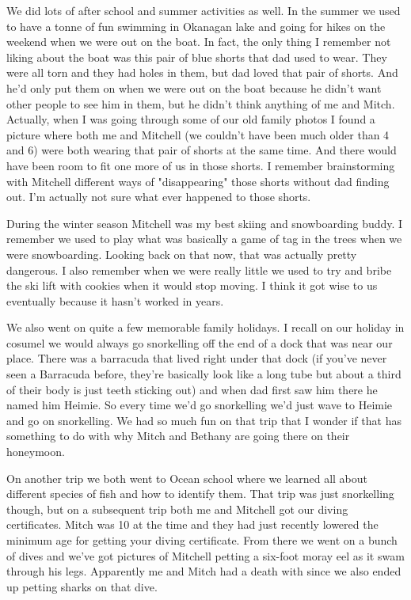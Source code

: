 We did lots of after school and summer activities as well. In the summer we used to have a tonne of fun swimming in Okanagan lake and going for hikes on the weekend when we were out on the boat. In fact, the only thing I remember not liking about the boat was this pair of blue shorts that dad used to wear. They were all torn and they had holes in them, but dad loved that pair of shorts. And he'd only put them on when we were out on the boat because he didn't want other people to see him in them, but he didn't think anything of me and Mitch. Actually, when I was going through some of our old family photos I found a picture where both me and Mitchell (we couldn't have been much older than 4 and 6) were both wearing that pair of shorts at the same time. And there would have been room to fit one more of us in those shorts. I remember brainstorming with Mitchell different ways of "disappearing" those shorts without dad finding out. I'm actually not sure what ever happened to those shorts.

During the winter season Mitchell was my best skiing and snowboarding buddy. I remember we used to play what was basically a game of tag in the trees when we were snowboarding. Looking back on that now, that was actually pretty dangerous. I also remember when we were really little we used to try and bribe the ski lift with cookies when it would stop moving. I think it got wise to us eventually because it hasn't worked in years.

We also went on quite a few memorable family holidays. I recall on our holiday in cosumel we would always go snorkelling off the end of a dock that was near our place. There was a barracuda that lived right under that dock (if you've never seen a Barracuda before, they're basically look like a long tube but about a third of their body is just teeth sticking out) and when dad first saw him there he named him Heimie. So every time we'd go snorkelling we'd just wave to Heimie and go on snorkelling. We had so much fun on that trip that I wonder if that has something to do with why Mitch and Bethany are going there on their honeymoon.

On another trip we both went to Ocean school where we learned all about different species of fish and how to identify them. That trip was just snorkelling though, but on a subsequent trip both me and Mitchell got our diving certificates. Mitch was 10 at the time and they had just recently lowered the minimum age for getting your diving certificate. From there we went on a bunch of dives and we've got pictures of Mitchell petting a six-foot moray eel as it swam through his legs. Apparently me and Mitch had a death with since we also ended up petting sharks on that dive.

